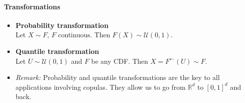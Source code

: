 \documentclass[a4paper,landscape,8pt,fleqn]{scrartcl}
\renewcommand{\emph}[1]{\textbf{#1}}
\begin{document}
\begin{multicols*}{3}
\paragraph{Transformations}
\begin{itemize}
\item \emph{Probability transformation} \\
Let $X \sim F$, $F$ continuous. Then $F(X) \sim \mathcal{U}(0,1)$.
\item \emph{Quantile transformation} \\
Let $U \sim \mathcal{U}(0,1)$ and $F$ be any CDF. Then $X = F^\leftarrow(U) \sim F$.
\item \textit{Remark:} Probability and quantile transformations are the key to all applications involving copulas. They allow us to go from $\mathbb{R}^d$ to $[0,1]^d$ and back.
\end{itemize}


\end{multicols*}
\end{document}
